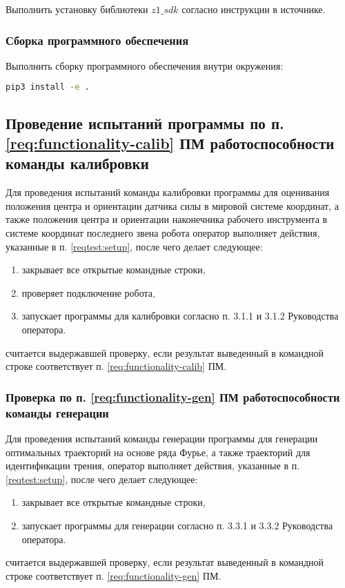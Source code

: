 Выполнить установку библиотеки $z1\_sdk$ согласно инструкции в источнике.

\subsubsection{Сборка программного обеспечения}

Выполнить сборку программного обеспечения внутри окружения:
\begin{lstlisting}[language=bash, numbers=none, frame=single]
    pip3 install -e .
\end{lstlisting}

\subsection{Проведение испытаний программы \productnamesecond по п. \ref{req:functionality-calib} ПМ работоспособности команды калибровки} \label{reqtest:functionality-calib}
Для проведения испытаний команды калибровки программы \productnamesecond для оценивания положения центра и ориентации датчика силы в мировой системе координат, а также положения центра и ориентации наконечника рабочего инструмента в системе координат последнего звена робота оператор выполняет действия, указанные в п. \ref{reqtest:setup}, после чего делает следующее:
\begin{enumerate}
    \item закрывает все открытые командные строки,
    \item проверяет подключение робота,
    \item запускает программы для калибровки согласно п. 3.1.1 и 3.1.2 Руководства оператора.
\end{enumerate}
 \programname считается выдержавшей проверку, если результат выведенный в командной строке соответствует п. \ref{req:functionality-calib} ПМ.


\subsubsection{Проверка по п. \ref{req:functionality-gen} ПМ работоспособности команды генерации} \label{reqtest:functionality-gen}

Для проведения испытаний команды генерации программы \productnamesecond для генерации оптимальных траекторий на основе ряда Фурье, а также траекторий для идентификации трения, оператор выполняет действия, указанные в п. \ref{reqtest:setup}, после чего делает следующее:
\begin{enumerate}
    \item закрывает все открытые командные строки,
    \item запускает программы для генерации согласно п. 3.3.1 и 3.3.2 Руководства оператора.
\end{enumerate}
\programname считается выдержавшей проверку, если результат выведенный в командной строке соответствует п. \ref{req:functionality-gen} ПМ.

